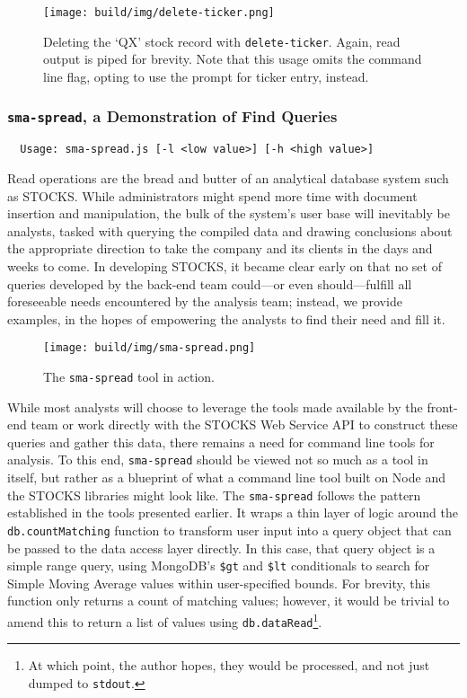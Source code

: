 \documentclass[
11pt,
titlepage,
]{article}
\begin{document}
\begin{figure}[tbp]
  \texttt{[image: build/img/delete-ticker.png]}
  \caption{Deleting the `QX' stock record with \texttt{delete-ticker}. Again,
    read output is piped for brevity. Note that this usage omits the command
    line flag, opting to use the prompt for ticker entry, instead.}
  \label{fig:delete-ticker}
\end{figure}

\subsubsection{\texttt{sma-spread}, a Demonstration of Find Queries}

\begin{lstlisting}
  Usage: sma-spread.js [-l <low value>] [-h <high value>]
\end{lstlisting}

Read operations are the bread and butter of an analytical database system such
as STOCKS. While administrators might spend more time with document insertion
and manipulation, the bulk of the system's user base will inevitably be
analysts, tasked with querying the compiled data and drawing conclusions about
the appropriate direction to take the company and its clients in the days and
weeks to come. In developing STOCKS, it became clear early on that no set of
queries developed by the back-end team could---or even should---fulfill all
foreseeable needs encountered by the analysis team; instead, we provide
examples, in the hopes of empowering the analysts to find their need and fill it.

\begin{figure}[bp]
  \texttt{[image: build/img/sma-spread.png]}
  \caption{The \texttt{sma-spread} tool in action.}
  \label{fig:sma-spread}
\end{figure}

While most analysts will choose to leverage the tools made available by the
front-end team or work directly with the STOCKS Web Service API to construct
these queries and gather this data, there remains a need for command line tools
for analysis. To this end, \texttt{sma-spread} should be viewed not so much as a
tool in itself, but rather as a blueprint of what a command line tool built on
Node and the STOCKS libraries might look like. The \texttt{sma-spread} follows
the pattern established in the tools presented earlier. It wraps a thin layer of
logic around the \texttt{db.countMatching} function to transform user input into
a query object that can be passed to the data access layer directly. In this
case, that query object is a simple range query, using MongoDB's \texttt{\$gt}
and \texttt{\$lt} conditionals to search for Simple Moving Average values within
user-specified bounds. For brevity, this function only returns a count of
matching values; however, it would be trivial to amend this to return a list of
values using \texttt{db.dataRead}\footnote{At which point, the author hopes,
they would be processed, and not just dumped to \texttt{stdout}.}.
\end{document}
